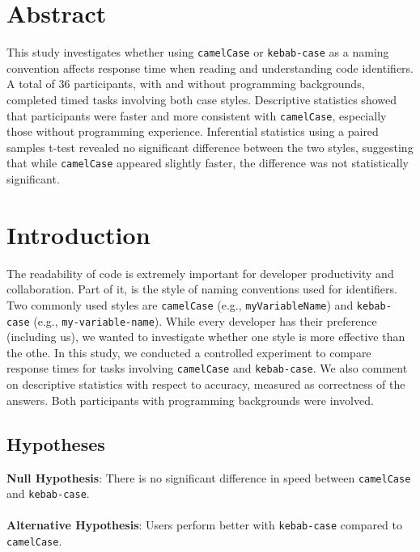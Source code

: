\documentclass[unicode,11pt,a4paper,oneside,numbers=endperiod,openany]{scrartcl}
\begin{document}
\setassignment
{}

\newline


\section{Abstract}
This study investigates whether using \texttt{camelCase} or \texttt{kebab-case} as a naming convention affects response time when reading and understanding code identifiers. A total of 36 participants, with and without programming backgrounds, completed timed tasks involving both case styles. Descriptive statistics showed that participants were faster and more consistent with \texttt{camelCase}, especially those without programming experience. Inferential statistics using a paired samples t-test revealed no significant difference between the two styles, suggesting that while \texttt{camelCase} appeared slightly faster, the difference was not statistically significant.

\section{Introduction}
The readability of code is extremely important for developer productivity and collaboration. Part of it, is the style of naming conventions used for identifiers. Two commonly used styles are \texttt{camelCase} (e.g., \texttt{myVariableName}) and \texttt{kebab-case} (e.g., \texttt{my-variable-name}). While every developer has their preference (including us), we wanted to investigate whether one style is more effective than the othe.
In this study, we conducted a controlled experiment to compare response times for tasks involving \texttt{camelCase} and \texttt{kebab-case}. We also comment on descriptive statistics with respect to accuracy, measured as correctness of the answers. Both participants with programming backgrounds were involved.


\subsection{Hypotheses}
\textbf{Null Hypothesis}: There is no significant difference in speed between \texttt{camelCase} and \texttt{kebab-case}. \\
\hfill \\
\textbf{Alternative Hypothesis}: Users perform better with \texttt{kebab-case} compared to \texttt{camelCase}.
\end{document}
